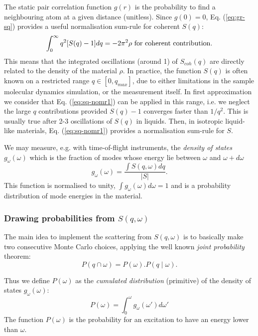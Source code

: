 The static pair correlation function $g(r)$ is the probability to find a neighbouring atom at a given distance (unitless). Since $g(0) = 0$, Eq. (\ref{eq:gr-sq}) provides a useful normalisation sum-rule for coherent $S(q)$:
\begin{equation}
\label{eq:sq-nomr1}
\int_0^\infty q^2 [S(q) - 1] dq = -2\pi^2\rho {\rm\ for\ coherent\ contribution.}
\end{equation}
This means that the integrated oscillations (around 1) of $S_{coh}(q)$ are directly related to the density of the material $\rho$.
In practice, the function $S(q)$ is often known on a restricted range $q \in [0, q_{max} ]$, due to either limitations in the sample molecular dynamics simulation, or the measurement itself.
In first approximation we consider that Eq. (\ref{eq:sq-nomr1}) can be applied in this range, i.e. we neglect the large $q$ contributions provided $S(q)-1$ converges faster than $1/q^2$. This is usually true after 2-3 oscillations of $S(q)$ in liquids.
Then, in isotropic liquid-like materials, Eq. (\ref{eq:sq-nomr1}) provides a normalisation sum-rule for $S$.

We may measure, e.g. with time-of-flight instruments, the \emph{density of states} $g_{\omega}(\omega)$  which is the fraction of modes whose energy lie between $\omega$ and $\omega+d\omega$ \cite{lovesey84}
\begin{equation}
g_{\omega}(\omega) = \frac{\int S(q,\omega) dq}{|S|} .
\end{equation}
This function is normalised to unity, $\int g_{\omega}(\omega) d\omega = 1$ and is a probability distribution of mode energies in the material.

\subsubsection{Drawing probabilities from $S(q, \omega)$}

The main idea to implement the scattering from $S(q, \omega)$ is to basically make two consecutive Monte Carlo choices, applying the well known \emph{joint probability} theorem:
\begin{equation}
\label{eq:jointproba}
P(q \cap \omega) = P(\omega).P(q \mid \omega) .
\end{equation}

Thus we define $P(\omega)$ as the \emph{cumulated distribution} (primitive) of the density of states $g_{\omega}(\omega)$:
\begin{equation}\label{eq:Pw}
P(\omega) = \int_0^\omega g_{\omega}(\omega') d\omega'
\end{equation}
The function $P(\omega)$ is the probability for an excitation to have an energy lower than $\omega$.

